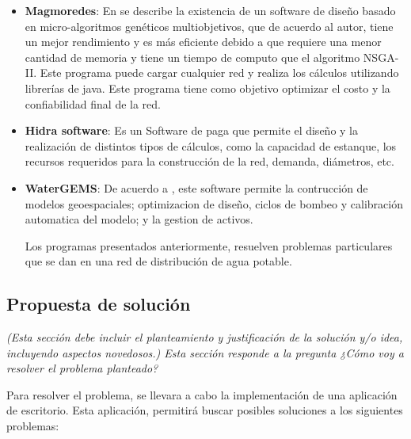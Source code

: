\documentclass[11pt,letterpaper]{article}
\begin{document}
\begin{itemize}
	\item \textbf{Magmoredes}: En \cite{Edwin2017} se describe la existencia de un software de diseño basado en micro-algoritmos genéticos multiobjetivos, que de acuerdo al autor, tiene un mejor rendimiento y es más eficiente debido a que requiere una menor cantidad de memoria y tiene un tiempo de computo que el algoritmo NSGA-II. Este programa puede cargar cualquier red y realiza los cálculos utilizando librerías de java. Este programa tiene como objetivo optimizar el costo y la confiabilidad final de la red.
	
	
	\item \textbf{Hidra software}: Es un Software de paga que permite el diseño y la realización de distintos tipos de cálculos, como la capacidad de estanque, los recursos requeridos para la construcción de la red, demanda, diámetros, etc.
	
	
	\item \textbf{WaterGEMS}: De acuerdo a \cite{Bentley2017}, este software permite la  contrucción de modelos geoespaciales; optimizacion de diseño, ciclos de bombeo y calibración automatica del modelo; y la  gestion de activos. 
	
	Los programas presentados anteriormente, resuelven problemas particulares que se dan en una red de distribución de agua potable.
\end{itemize}

\subsection{Propuesta de solución}
\emph{(Esta sección debe incluir el planteamiento y justificación de la solución y/o idea, incluyendo aspectos novedosos.) Esta sección responde a la pregunta ¿Cómo voy a resolver el problema planteado?}

Para resolver el problema, se llevara a cabo la implementación de una aplicación de escritorio. Esta aplicación, permitirá buscar posibles soluciones a los siguientes problemas:
\end{document}
